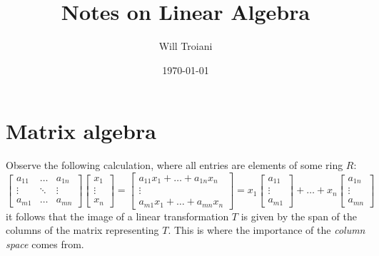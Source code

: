 \documentclass[12pt]{article}
\title{Notes on Linear Algebra}
\author{Will Troiani}
\date{\today}
\theoremstyle{plain}
\theoremstyle{definition}
\begin{document}
\maketitle

\section{Matrix algebra}
Observe the following calculation, where all entries are elements of some ring $R$:
\begin{equation}
    \begin{bmatrix}
    a_{11} & \hdots & a_{1n}\\
    \vdots & \ddots & \vdots\\
    a_{m1} & \hdots & a_{mn}
    \end{bmatrix}
    \begin{bmatrix}
    x_1\\
    \vdots\\
    x_n
    \end{bmatrix}
    =
    \begin{bmatrix}
    a_{11}x_1 + \hdots + a_{1n}x_n\\
    \vdots\\
    a_{m1}x_1 + \hdots + a_{mn}x_n
    \end{bmatrix}
    =
    x_1
    \begin{bmatrix}
    a_{11}\\
    \vdots\\
    a_{m1}
    \end{bmatrix}
    + \hdots +
    x_n
    \begin{bmatrix}
    a_{1n}\\
    \vdots\\
    a_{mn}
    \end{bmatrix}
\end{equation}
it follows that the image of a linear transformation $T$ is given by the span of the columns of the matrix representing $T$. This is where the importance of the \emph{column space} comes from.
\end{document}
